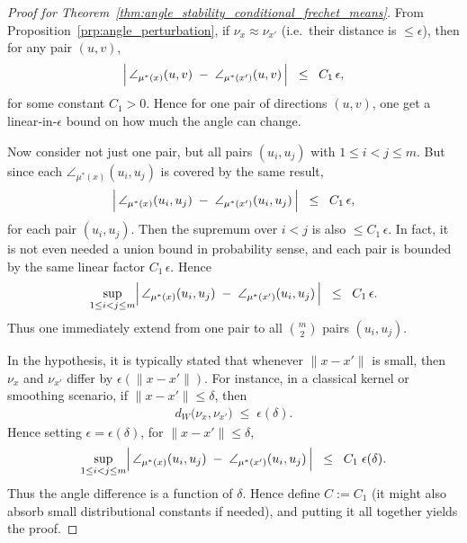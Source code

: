 \begin{proof}[Proof for Theorem~\ref{thm:angle_stability_conditional_frechet_means}]
    From Proposition~\ref{prp:angle_perturbation}, if \(\nu_x\approx \nu_{x'}\) (i.e.\ their distance is \(\le\epsilon\)), then for any pair \((u,v)\),
    \begin{align*}
        \Bigl|\,
        \angle_{\mu^*(x)}(u,v)
        \;-\;
        \angle_{\mu^*(x')}(u,v)
        \,\Bigr|
        \;\;\le\;\;
        C_1\,\epsilon,
    \end{align*}
    for some constant \(C_1>0\).
    Hence for one pair of directions \((u,v)\), one get a linear‐in‐\(\epsilon\) bound on how much the angle can change.
    
    Now consider not just one pair, but all pairs \((u_i,u_j)\) with \(1\le i<j\le m\). 
    But since each \(\angle_{\mu^*(x)}(u_i,u_j)\) is covered by the same result,
    \begin{align*}
        \Bigl|\,
        \angle_{\mu^*(x)}(u_i,u_j)
        \;-\;
        \angle_{\mu^*(x')}(u_i,u_j)
        \,\Bigr|
        \;\;\le\;\;
        C_1\,\epsilon,
    \end{align*}
    for each pair \((u_i,u_j)\).
    Then the supremum over \(i<j\) is also \(\le C_1\,\epsilon\).
    In fact, it is not even needed a union bound in probability sense, and each pair is bounded by the same linear factor \(C_1\,\epsilon\).
    Hence
    \begin{align*}
        \sup_{1\le i<j\le m}
        \Bigl|\,
        \angle_{\mu^*(x)}(u_i,u_j)
        \;-\;
        \angle_{\mu^*(x')}(u_i,u_j)
        \,\Bigr|
        \;\;\le\;\;
        C_1\,\epsilon.
    \end{align*}
    Thus one immediately extend from one pair to all \(\binom{m}{2}\) pairs \((u_i,u_j)\). 

    In the hypothesis, it is typically stated that whenever \(\|x - x'\|\) is small, then \(\nu_x\) and \(\nu_{x'}\) differ by \(\epsilon(\|x-x'\|)\).
    For instance, in a classical kernel or smoothing scenario, if \(\|x - x'\|\le\delta\), then
    \begin{align*}
        d_W\bigl(\nu_x,\nu_{x'}\bigr)
        \;\le\;
        \epsilon(\delta).
    \end{align*}
    Hence setting \(\epsilon=\epsilon(\delta)\), for \(\|x - x'\|\le\delta\),
    \begin{align*}
        \sup_{1\le i<j\le m}
        \Bigl|\,
        \angle_{\mu^*(x)}(u_i,u_j)
        \;-\;
        \angle_{\mu^*(x')}(u_i,u_j)
        \,\Bigr|
        \;\;\le\;\;
        C_1\;\epsilon(\delta).
    \end{align*}
    Thus the angle difference is a function of \(\delta\).
    Hence define \(C := C_1\) (it might also absorb small distributional constants if needed), and putting it all together yields the proof.
\end{proof}

